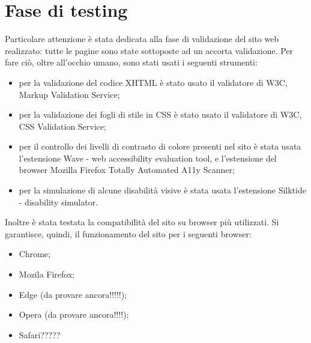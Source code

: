 \section{Fase di testing}
Particolare attenzione è stata dedicata alla fase di validazione del sito web realizzato: tutte le pagine sono state sottoposte ad un accorta validazione. Per fare ciò, oltre all'occhio umano, sono stati usati i seguenti strumenti: 
\begin{itemize}
	\item per la validazione del codice XHTML è stato usato il validatore di W3C, Markup Validation Service;
	\item per la validazione dei fogli di stile in CSS è stato usato il validatore di W3C, CSS Validation Service;
	\item per il controllo dei livelli di contrasto di colore presenti nel sito è stata usata l'estensione Wave - web accessibility evaluation tool, e l'estensione del browser Mozilla Firefox Totally Automated A11y Scanner;
	\item per la simulazione di alcune disabilità visive è stata usata l'estensione Silktide - disability simulator.
\end{itemize}
Inoltre è stata testata la compatibilità del sito su browser più utilizzati. Si garantisce, quindi, il funzionamento del sito per i seguenti browser:
\begin{itemize}
\item Chrome;
\item Mozila Firefox;
\item Edge (da provare ancora!!!!!);
\item Opera (da provare ancora!!!!);
\item Safari?????
\end{itemize}